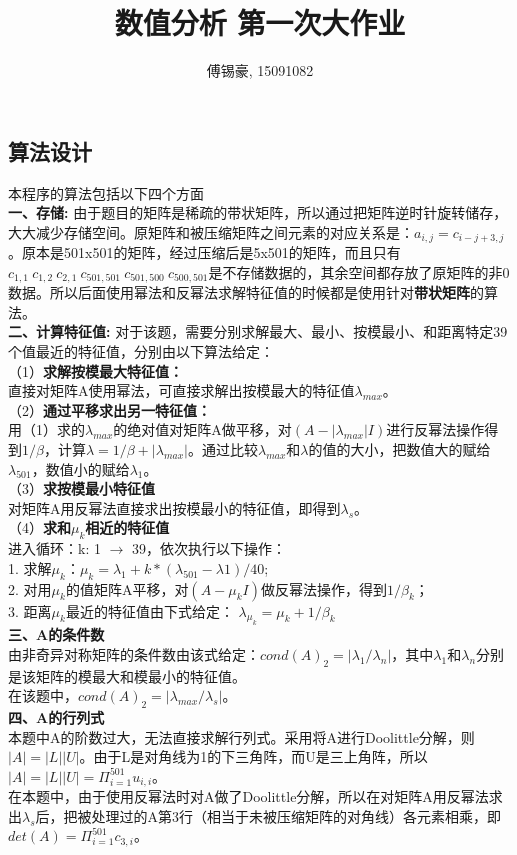 \documentclass{ctexart}
\title{\textbf{数值分析 第一次大作业}}
\author{傅锡豪, 15091082}
\begin{document}
\begin{spacing}{1.8}
\maketitle

\section{算法设计}
本程序的算法包括以下四个方面\\
\textbf{一、存储: }
由于题目的矩阵是稀疏的带状矩阵，所以通过把矩阵逆时针旋转储存，大大减少存储空间。原矩阵和被压缩矩阵之间元素的对应关系是：$a_{i,j} = c_{i-j+3,j}$。原本是501x501的矩阵，经过压缩后是5x501的矩阵，而且只有$c_{1,1}\ c_{1,2}\ 
c_{2,1}\ c_{501,501}\ c_{501,500}\ c_{500,501}$是不存储数据的，其余空间都存放了原矩阵的非0数据。所以后面使用幂法和反幂法求解特征值的时候都是使用针对\textbf{带状矩阵}的算法。\\
\textbf{二、计算特征值: }
对于该题，需要分别求解最大、最小、按模最小、和距离特定39个值最近的特征值，分别由以下算法给定：\\
（1）\textbf{求解按模最大特征值：}\\
直接对矩阵A使用幂法，可直接求解出按模最大的特征值$\lambda_{max}$。\\
（2）\textbf{通过平移求出另一特征值：}\\
用（1）求的$\lambda_{max}$的绝对值对矩阵A做平移，对$(A-|\lambda_{max}|I)$进行反幂法操作得到$1/\beta$，计算$\lambda = 1/\beta +|\lambda_{max}|$。通过比较$\lambda_{max}$和$\lambda$的值的大小，把数值大的赋给$\lambda_{501}$，数值小的赋给$\lambda_{1}$。\\
（3）\textbf{求按模最小特征值}\\
对矩阵A用反幂法直接求出按模最小的特征值，即得到$\lambda_{s}$。\\
（4）\textbf{求和$\mu_k$相近的特征值}\\
进入循环：k: 1 $\rightarrow$ 39，依次执行以下操作：\\
	1. 求解$\mu_k$：$\mu_k = \lambda_1 + k*(\lambda_{501}-\lambda{1})/40$;\\
	2. 对用$\mu_k$的值矩阵A平移，对$(A-\mu_kI)$做反幂法操作，得到$1/\beta_k$；\\
	3. 距离$\mu_k$最近的特征值由下式给定： $\lambda_{\mu_k} = \mu_k + 1/\beta_k$ 
\\
\textbf{三、A的条件数}\\
由非奇异对称矩阵的条件数由该式给定：$cond(A)_2 = |\lambda_1 / \lambda_n|$，其中$\lambda_1$和$\lambda_n$分别是该矩阵的模最大和模最小的特征值。\\
在该题中，$cond(A)_2 = |\lambda_{max} / \lambda_s|$。\\
\textbf{四、A的行列式}\\
本题中A的阶数过大，无法直接求解行列式。采用将A进行Doolittle分解，则$|A| = |L||U|$。由于L是对角线为1的下三角阵，而U是三上角阵，所以$|A| = |L||U| = \Pi_{i=1}^{501} u_{i,i}$。\\
在本题中，由于使用反幂法时对A做了Doolittle分解，所以在对矩阵A用反幂法求出$\lambda_{s}$后，把被处理过的A第3行（相当于未被压缩矩阵的对角线）各元素相乘，即 $det(A) = \Pi_{i=1}^{501} c_{3,i}$。
\end{spacing}
\end{document}
